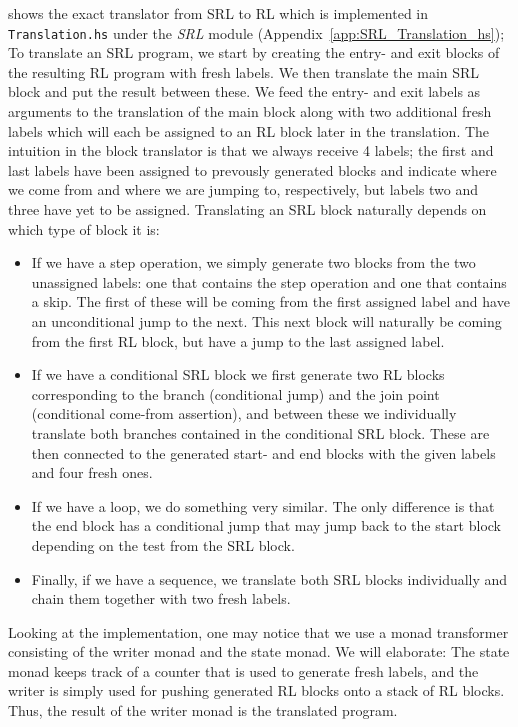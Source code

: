 \cite[Fig.~21]{REV} shows the exact translator from SRL to RL which is implemented in \texttt{Translation.hs} under the \textit{SRL} module (Appendix~\ref{app:SRL_Translation_hs}); To translate an SRL program, we start by creating the entry- and exit blocks of the resulting RL program with fresh labels. We then translate the main SRL block and put the result between these. We feed the entry- and exit labels as arguments to the translation of the main block along with two additional fresh labels which will each be assigned to an RL block later in the translation. The intuition in the block translator is that we always receive 4 labels; the first and last labels have been assigned to prevously generated blocks and indicate where we come from and where we are jumping to, respectively, but labels two and three have yet to be assigned. Translating an SRL block naturally depends on which type of block it is:
\begin{itemize}
  \item If we have a step operation, we simply generate two blocks from the two unassigned labels: one that contains the step operation and one that contains a skip. The first of these will be coming from the first assigned label and have an unconditional jump to the next. This next block will naturally be coming from the first RL block, but have a jump to the last assigned label.
  \item If we have a conditional SRL block we first generate two RL blocks corresponding to the branch (conditional jump) and the join point (conditional come-from assertion), and between these we individually translate both branches contained in the conditional SRL block. These are then connected to the generated start- and end blocks with the given labels and four fresh ones.
  \item If we have a loop, we do something very similar. The only difference is that the end block has a conditional jump that may jump back to the start block depending on the test from the SRL block.
  \item Finally, if we have a sequence, we translate both SRL blocks individually and chain them together with two fresh labels.
\end{itemize}
Looking at the implementation, one may notice that we use a monad transformer consisting of the writer monad and the state monad. We will elaborate: The state monad keeps track of a counter that is used to generate fresh labels, and the writer is simply used for pushing generated RL blocks onto a stack of RL blocks. Thus, the result of the writer monad is the translated program.




